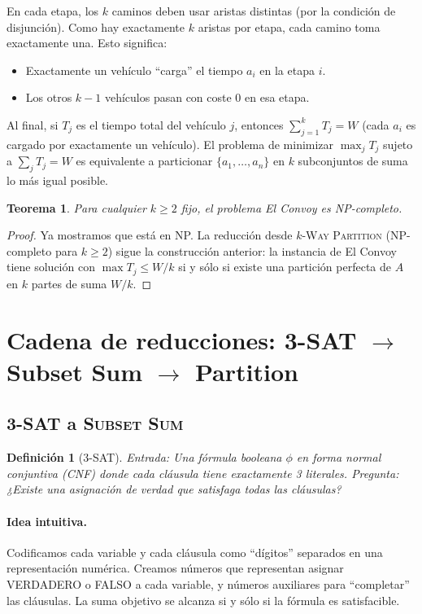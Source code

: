 \documentclass[11pt]{article}
\newtheorem{theorem}{Teorema}
\newtheorem{definition}{Definición}
\begin{document}
En cada etapa, los $k$ caminos deben usar aristas distintas (por la condición de disjunción). Como hay exactamente $k$ aristas por etapa, cada camino toma exactamente una. Esto significa:
\begin{itemize}
  \item Exactamente un vehículo ``carga'' el tiempo $a_i$ en la etapa $i$.
  \item Los otros $k-1$ vehículos pasan con coste $0$ en esa etapa.
\end{itemize}

Al final, si $T_j$ es el tiempo total del vehículo $j$, entonces $\sum_{j=1}^k T_j = W$ (cada $a_i$ es cargado por exactamente un vehículo). El problema de minimizar $\max_j T_j$ sujeto a $\sum_j T_j = W$ es equivalente a particionar $\{a_1,\dots,a_n\}$ en $k$ subconjuntos de suma lo más igual posible.

\begin{theorem}
Para cualquier $k\ge 2$ fijo, el problema El Convoy es NP-completo.
\end{theorem}
\begin{proof}
Ya mostramos que está en NP. La reducción desde \textsc{$k$-Way Partition} (NP-completo para $k\ge 2$) sigue la construcción anterior: la instancia de El Convoy tiene solución con $\max T_j \le W/k$ si y sólo si existe una partición perfecta de $A$ en $k$ partes de suma $W/k$.
\end{proof}

\section{Cadena de reducciones: 3-SAT $\to$ Subset Sum $\to$ Partition}
\subsection{\textsc{3-SAT} a \textsc{Subset Sum}}

\begin{definition}[\textsc{3-SAT}]
Entrada: Una fórmula booleana $\phi$ en forma normal conjuntiva (CNF) donde cada cláusula tiene exactamente 3 literales. Pregunta: ¿Existe una asignación de verdad que satisfaga todas las cláusulas?
\end{definition}

\paragraph{Idea intuitiva.} Codificamos cada variable y cada cláusula como ``dígitos'' separados en una representación numérica. Creamos números que representan asignar VERDADERO o FALSO a cada variable, y números auxiliares para ``completar'' las cláusulas. La suma objetivo se alcanza si y sólo si la fórmula es satisfacible.
\end{document}
